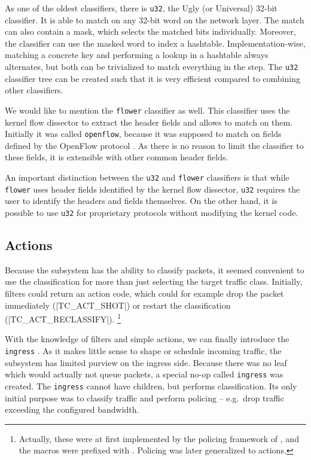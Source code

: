 As one of the oldest classifiers, there is \texttt{u32}, the Ugly (or
Universal) 32-bit classifier. It is able to match on any 32-bit word on the
network layer. The match can also contain a mask, which selects the matched bits
individually. Moreover, the classifier can use the masked word to index
a hashtable. Implementation-wise, matching a concrete key and performing
a lookup in a hashtable always alternates, but both can be trivialized to match everything in the step.
The \texttt{u32} classifier tree can be created such that it is very efficient
compared to combining other classifiers.

We would like to mention the \texttt{flower} classifier as well. This
classifier uses the kernel flow dissector to extract the header fields and allows
to match on them. Initially it was called \texttt{openflow}, because it was
supposed to match on fields defined by the OpenFlow protocol \cite{openflow}. As
there is no reason to limit the classifier to these fields, it is extensible with
other common header fields.

An important distinction between the \texttt{u32} and \texttt{flower}
classifiers is that while \texttt{flower} uses
header fields identified by the kernel flow dissector, \texttt{u32} requires the
user to identify the headers and fields themselves. On the other hand, it is
possible to use \texttt{u32} for proprietary protocols without modifying the
kernel code.

\subsection{Actions}

Because the  subsystem has the ability to classify packets, it seemed convenient to
use the classification for more than just selecting the target traffic class.
Initially, filters could return an action code, which could for example drop the
packet immediately (\macro|TC_ACT_SHOT|) or restart the classification
(\macro|TC_ACT_RECLASSIFY|).
\footnote{Actually, these were at first implemented by the policing framework of
, and the macros were prefixed with . Policing was
later generalized to actions.}

With the knowledge of filters and simple actions, we can finally introduce the
\texttt{ingress} \qdisc. As it makes little sense to shape or schedule incoming
traffic, the  subsystem has limited purview on the ingress side.
Because there was no leaf \qdisc{} which would actually not queue packets,
a special no-op \qdisc{} called \texttt{ingress} was created.
The \texttt{ingress} \qdisc{} cannot have children, but performs
classification. Its only initial purpose was to classify traffic and perform policing
-- e.g.~drop traffic exceeding the configured bandwidth.

